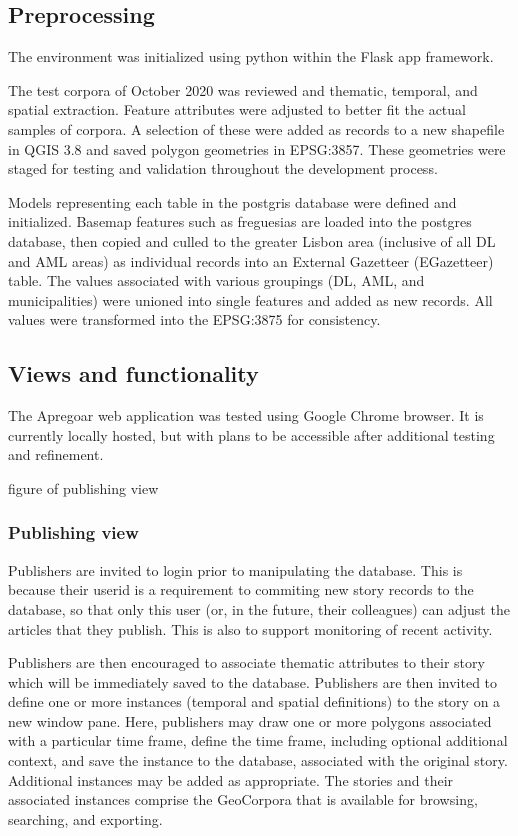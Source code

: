 \subsection{Preprocessing}
The environment was initialized using python within the Flask app framework.

The test corpora of October 2020 was reviewed and thematic, temporal, and spatial extraction. Feature attributes were adjusted to better fit the actual samples of corpora. A selection of these were added as records to a new shapefile in QGIS 3.8 and saved polygon geometries in EPSG:3857.  These geometries were staged for testing and validation throughout the development process.

Models representing each table in the postgris database were defined and initialized. Basemap features such as freguesias are loaded into the postgres database, then copied and culled to the greater Lisbon area (inclusive of all DL and AML areas) as individual records into an External Gazetteer (EGazetteer) table. The values associated with various groupings (DL, AML, and municipalities) were unioned into single features and added as new records. All values were transformed into the EPSG:3875 for consistency.

\subsection{Views and functionality}
The Apregoar web application was tested using Google Chrome browser. It is currently locally hosted, but with plans to be accessible after additional testing and refinement.

{\color{red}figure of publishing view}

\subsubsection{Publishing view}
Publishers are invited to login prior to manipulating the database. This is because their userid is a requirement to commiting new story records to the database, so that only this user (or, in the future, their colleagues) can adjust the articles that they publish. This is also to support monitoring of recent activity.

Publishers are then encouraged to associate thematic attributes to their story which will be immediately saved to the database. Publishers are then invited to define one or more instances (temporal and spatial definitions) to the story on a new window pane. Here, publishers may draw one or more polygons associated with a particular time frame, define the time frame, including optional additional context, and save the instance to the database, associated with the original story. Additional instances may be added as appropriate.  The stories and their associated instances comprise the GeoCorpora that is available for browsing, searching, and exporting.


